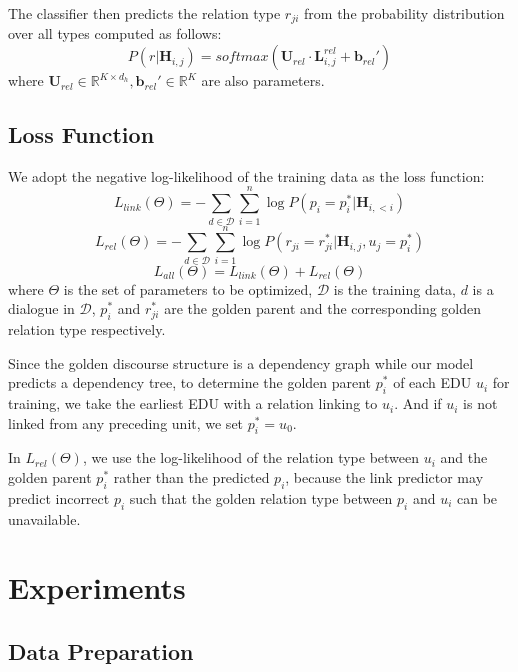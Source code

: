 \documentclass[letterpaper]{article} \usepackage{aaai19}  \usepackage{times}  \usepackage{helvet}  \usepackage{courier}  \usepackage{url}  \usepackage{graphicx}  \usepackage{amssymb}
\begin{document}
The classifier then predicts the relation type $r_{ji}$ from the probability distribution over all types computed as follows:
\begin{equation}
    P(r|\bm{H}_{i,j}) = softmax(\bm{U}_{rel}\cdot \bm{L}_{i,j}^{rel} + \bm{b}_{rel}')
\end{equation} 
where $\bm{U}_{rel}\in\mathbb{R}^{K\times d_h},\bm{b}_{rel}'\in\mathbb{R}^K$ are also parameters.

\subsection{Loss Function}

We adopt the negative log-likelihood of the training data as the loss function:
\begin{equation}
    L_{link}(\Theta) = -\sum_{d\in \mathcal{D}} \sum_{i=1}^n \log P(p_i=p_i^{*}|\bm{H}_{i,<i})
\end{equation} 
\begin{equation}
    L_{rel}(\Theta) = -\sum_{d\in \mathcal{D}} \sum_{i=1}^n \log P(r_{ji}=r_{ji}^{*}|\bm{H}_{i,j},u_j=p_i^{*})
\end{equation}
\begin{equation}
    L_{all}(\Theta)=L_{link}(\Theta)+L_{rel}(\Theta)
\end{equation}
where $\Theta$ is the set of parameters to be optimized, $\mathcal{D}$ is the training data, $d$ is a dialogue in $\mathcal{D}$, $p_i^*$ and $r_{ji}^*$ are the golden parent and the corresponding golden relation type respectively.

Since the golden discourse structure is a dependency graph while our model predicts a dependency tree, to determine the golden parent $p_i^*$ of each EDU $u_i$ for training, we take the earliest EDU with a relation linking to $u_i$. And if $u_i$ is not linked from any preceding unit, we set $p_i^*=u_0$.

In $L_{rel}(\Theta)$, we use the log-likelihood of the relation type between $u_i$ and the golden parent $p_i^*$ rather than the predicted $p_i$, because the link predictor may predict incorrect $p_i$ such that the golden relation type between $p_i$ and $u_i$ can be unavailable.

\section{Experiments}

\subsection{Data Preparation}
\end{document}

